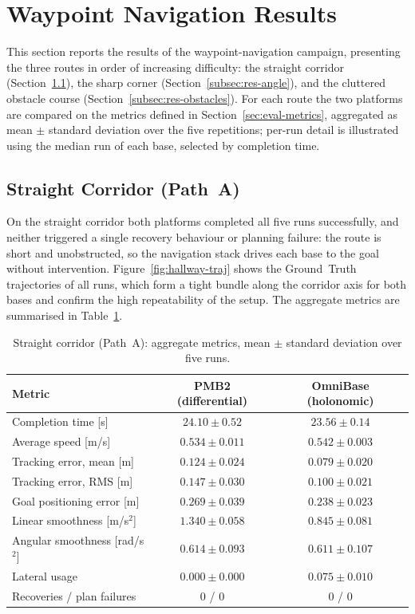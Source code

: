 \section{Waypoint Navigation Results}
\label{sec:wp-results}

This section reports the results of the waypoint-navigation campaign, presenting the three routes in order of increasing difficulty: the straight corridor (Section~\ref{subsec:res-hallway}), the sharp corner (Section~\ref{subsec:res-angle}), and the cluttered obstacle course (Section~\ref{subsec:res-obstacles}). For each route the two platforms are compared on the metrics defined in Section~\ref{sec:eval-metrics}, aggregated as mean $\pm$ standard deviation over the five repetitions; per-run detail is illustrated using the median run of each base, selected by completion time.

\subsection{Straight Corridor (Path~A)}
\label{subsec:res-hallway}

On the straight corridor both platforms completed all five runs successfully, and neither triggered a single recovery behaviour or planning failure: the route is short and unobstructed, so the navigation stack drives each base to the goal without intervention. Figure~\ref{fig:hallway-traj} shows the Ground~Truth trajectories of all runs, which form a tight bundle along the corridor axis for both bases and confirm the high repeatability of the setup. The aggregate metrics are summarised in Table~\ref{tab:hallway}.

\begin{table}[htbp]
\centering
\caption{Straight corridor (Path~A): aggregate metrics, mean $\pm$ standard deviation over five runs.}
\label{tab:hallway}
\begin{tabular}{lcc}
\toprule
Metric & PMB2 (differential) & OmniBase (holonomic) \\
\midrule
Completion time [s]            & $24.10 \pm 0.52$ & $23.56 \pm 0.14$ \\
Average speed [m/s]            & $0.534 \pm 0.011$ & $0.542 \pm 0.003$ \\
Tracking error, mean [m]      & $0.124 \pm 0.024$ & $0.079 \pm 0.020$ \\
Tracking error, RMS [m]       & $0.147 \pm 0.030$ & $0.100 \pm 0.021$ \\
Goal positioning error [m]    & $0.269 \pm 0.039$ & $0.238 \pm 0.023$ \\
Linear smoothness [m/s$^2$]   & $1.340 \pm 0.058$ & $0.845 \pm 0.081$ \\
Angular smoothness [rad/s$^2$] & $0.614 \pm 0.093$ & $0.611 \pm 0.107$ \\
Lateral usage                  & $0.000 \pm 0.000$ & $0.075 \pm 0.010$ \\
Recoveries / plan failures     & $0$ / $0$ & $0$ / $0$ \\
\bottomrule
\end{tabular}
\end{table}

